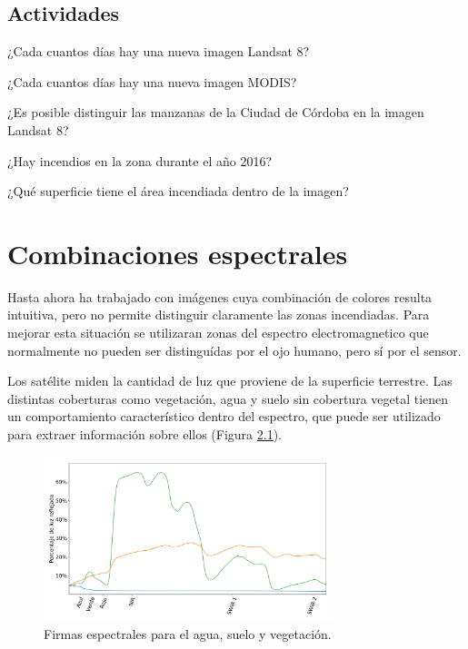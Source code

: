 \documentclass[a4paper,12pt]{book}
\begin{document}
\section{Actividades}
\begin{que}
    ¿Cada cuantos días hay una nueva imagen Landsat 8?
\end{que}
\begin{que}
    ¿Cada cuantos días hay una nueva imagen MODIS?
\end{que}
\begin{que}
    ¿Es posible distinguir las manzanas de la Ciudad de Córdoba en la imagen Landsat 8?
\end{que}
\begin{que}
    ¿Hay incendios en la zona durante el año 2016?
\end{que}
\begin{que}
    ¿Qué superficie tiene el área incendiada dentro de la imagen?
\end{que}

\chapter{Combinaciones espectrales}

Hasta ahora ha trabajado con imágenes cuya combinación de colores resulta intuitiva, pero no permite distinguir claramente las zonas incendiadas. Para mejorar esta situación se utilizaran zonas del espectro electromagnetico que normalmente no pueden ser distinguídas por el ojo humano, pero sí por el sensor.

Los satélite miden la cantidad de luz que proviene de la superficie terrestre. Las distintas coberturas como vegetación, agua y suelo sin cobertura vegetal tienen un comportamiento característico dentro del espectro, que puede ser utilizado para extraer información sobre ellos (Figura \ref{fig:spec}).


\begin{figure}[h!]
    \centering
    \includegraphics[width=0.75\textwidth]{fig:spec.png}
    \caption{Firmas espectrales para el agua, suelo y vegetación.}
    \label{fig:spec}
\end{figure}
\end{document}
